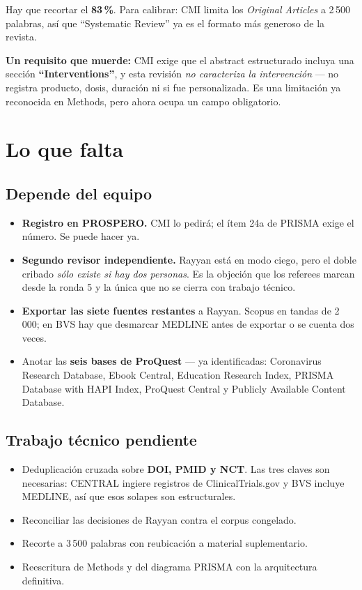 \documentclass[11pt,a4paper]{article}
\begin{document}
Hay que recortar el \textbf{83\,\%}. Para calibrar: CMI limita los
\textit{Original Articles} a 2\,500 palabras, así que ``Systematic Review'' ya es
el formato más generoso de la revista.

\textbf{Un requisito que muerde:} CMI exige que el abstract estructurado incluya
una sección \textbf{``Interventions''}, y esta revisión \emph{no caracteriza la
intervención} --- no registra producto, dosis, duración ni si fue personalizada.
Es una limitación ya reconocida en Methods, pero ahora ocupa un campo obligatorio.

\section{Lo que falta}

\subsection{Depende del equipo}

\begin{itemize}[leftmargin=1.4em,itemsep=3pt]
\item \textbf{Registro en PROSPERO.} CMI lo pedirá; el ítem 24a de PRISMA exige
el número. Se puede hacer ya.
\item \textbf{Segundo revisor independiente.} Rayyan está en modo ciego, pero el
doble cribado \emph{sólo existe si hay dos personas}. Es la objeción que los
referees marcan desde la ronda 5 y la única que no se cierra con trabajo técnico.
\item \textbf{Exportar las siete fuentes restantes} a Rayyan. Scopus en tandas de
2\,000; en BVS hay que desmarcar MEDLINE antes de exportar o se cuenta dos veces.
\item Anotar las \textbf{seis bases de ProQuest} --- ya identificadas: Coronavirus
Research Database, Ebook Central, Education Research Index, PRISMA Database with
HAPI Index, ProQuest Central y Publicly Available Content Database.
\end{itemize}

\subsection{Trabajo técnico pendiente}

\begin{itemize}[leftmargin=1.4em,itemsep=3pt]
\item Deduplicación cruzada sobre \textbf{DOI, PMID y NCT}. Las tres claves son
necesarias: CENTRAL ingiere registros de ClinicalTrials.gov y BVS incluye
MEDLINE, así que esos solapes son estructurales.
\item Reconciliar las decisiones de Rayyan contra el corpus congelado.
\item Recorte a 3\,500 palabras con reubicación a material suplementario.
\item Reescritura de Methods y del diagrama PRISMA con la arquitectura definitiva.
\end{itemize}
\end{document}
